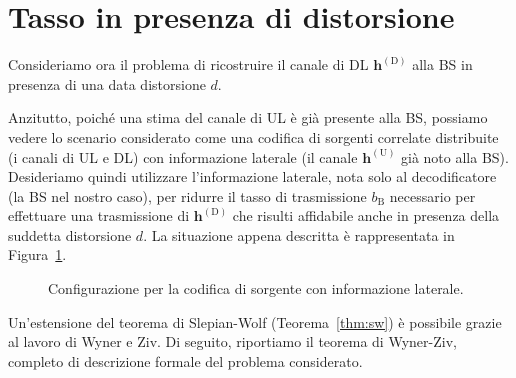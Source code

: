 \section{Tasso in presenza di distorsione}

Consideriamo ora il problema di ricostruire il canale di DL
\(\bm{h}^\mathrm{(D)}\) alla BS in presenza di una data distorsione \(d\).

Anzitutto, poiché una stima del canale di UL è già presente alla BS, possiamo
vedere lo scenario considerato come una codifica di sorgenti correlate
distribuite (i canali di UL e DL) con informazione laterale (il canale
\(\bm{h}^\mathrm{(U)}\) già noto alla BS). Desideriamo quindi utilizzare
l'informazione laterale, nota solo al decodificatore (la BS nel nostro caso),
per ridurre il tasso di trasmissione \(b_\mathrm{B}\) necessario per effettuare
una trasmissione di \(\bm{h}^\mathrm{(D)}\) che risulti affidabile anche in
presenza della suddetta distorsione \(d\). La situazione appena descritta è
rappresentata in Figura~\ref{fig:wz-configuration}.

\begin{figure}[ht]
    \centering
    
    \caption{Configurazione per la codifica di sorgente con informazione laterale.}
    \label{fig:wz-configuration}
\end{figure}

Un'estensione del teorema di Slepian-Wolf (Teorema~\ref{thm:sw}) è possibile
grazie al lavoro di Wyner e Ziv. Di seguito, riportiamo il teorema di
Wyner-Ziv, completo di descrizione formale del problema
considerato.\cite{1055508}

